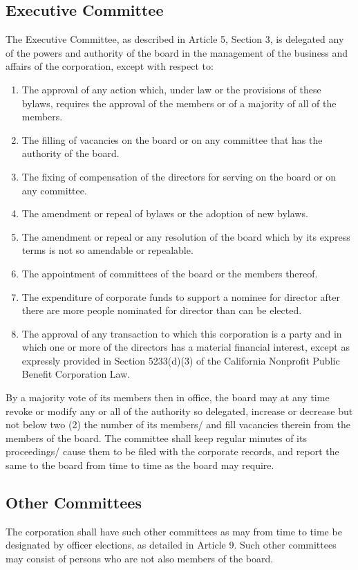 \documentclass{article}
\begin{document}
	\subsection{Executive Committee}
	The Executive Committee, as described in Article 5, Section 3, is delegated any of the powers and authority of the board in the management of the business and affairs of the corporation, except with respect to:
	\begin{enumerate}[\indent (a)]
		\item The approval of any action which, under law or the provisions of these bylaws, requires the approval of the members or of a majority of all of the members.
		\item The filling of vacancies on the board or on any committee that has the authority of the board. 
		\item The fixing of compensation of the directors for serving on the board or on any committee.
		\item The amendment or repeal of bylaws or the adoption of new bylaws.
		\item The amendment or repeal or any resolution of the board which by its express terms is not so amendable or repealable.
		\item The appointment of committees of the board or the members thereof.
		\item The expenditure of corporate funds to support a nominee for director after there are more people nominated for director than can be elected.
		\item The approval of any transaction to which this corporation is a party and in which one or more of the directors has a material financial interest, except as expressly provided in Section 5233(d)(3) of the California Nonprofit Public Benefit Corporation Law.
	\end{enumerate}
	By a majority vote of its members then in office, the board may at any time revoke or modify any or all of the authority so delegated, increase or decrease but not below two (2) the number of its members/ and fill vacancies therein from the members of the board.
	The committee shall keep regular minutes of its proceedings/ cause them to be filed with the corporate records, and report the same to the board from time to time as the board may require.
	
	\subsection{Other Committees}
	The corporation shall have such other committees as may from time to time be designated by officer elections, as detailed in Article 9. Such other committees may consist of persons who are not also members of the board. 
\end{document}
